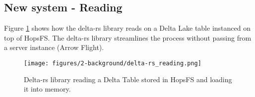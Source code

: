 \subsection{New system - Reading}

Figure \ref{fig:delta_rs_reading} shows how the delta-rs library reads on a Delta Lake table instanced on top of \gls{HopsFS}. The delta-rs library streamlines the process without passing from a server instance (Arrow Flight).

\begin{figure}
    \begin{center}
      \texttt{[image: figures/2-background/delta-rs\_reading.png]}
    \end{center}
    \caption[Delta-rs library - Read process]{Delta-rs library reading a Delta Table stored in \gls{HopsFS} and loading it into memory.}
    \label{fig:delta_rs_reading}
\end{figure}